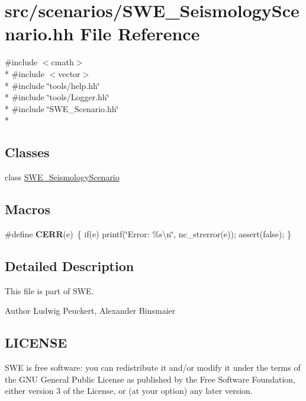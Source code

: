 \hypertarget{SWE__SeismologyScenario_8hh}{\section{src/scenarios/\-S\-W\-E\-\_\-\-Seismology\-Scenario.hh File Reference}
\label{SWE__SeismologyScenario_8hh}
}
{\ttfamily \#include $<$cmath$>$}\\*
{\ttfamily \#include $<$vector$>$}\\*
{\ttfamily \#include \char`\"{}tools/help.\-hh\char`\"{}}\\*
{\ttfamily \#include \char`\"{}tools/\-Logger.\-hh\char`\"{}}\\*
{\ttfamily \#include \char`\"{}S\-W\-E\-\_\-\-Scenario.\-hh\char`\"{}}\\*
\subsection*{Classes}
\begin{DoxyCompactItemize}
\item 
class \hyperlink{classSWE__SeismologyScenario}{S\-W\-E\-\_\-\-Seismology\-Scenario}
\end{DoxyCompactItemize}
\subsection*{Macros}
\begin{DoxyCompactItemize}
\item 
\hypertarget{SWE__SeismologyScenario_8hh_a05431804ae1ab8a7630a2b4572152855}{\#define {\bfseries C\-E\-R\-R}(e)~\{ if(e) printf(\char`\"{}Error\-: \%s\textbackslash{}n\char`\"{}, nc\-\_\-strerror(e)); assert(false); \}}\label{SWE__SeismologyScenario_8hh_a05431804ae1ab8a7630a2b4572152855}

\end{DoxyCompactItemize}


\subsection{Detailed Description}
This file is part of S\-W\-E.

\begin{DoxyAuthor}{Author}
Ludwig Peuckert, Alexander Binsmaier
\end{DoxyAuthor}
\hypertarget{Writer_8hh_LICENSE}{}\subsection{L\-I\-C\-E\-N\-S\-E}\label{Writer_8hh_LICENSE}
S\-W\-E is free software\-: you can redistribute it and/or modify it under the terms of the G\-N\-U General Public License as published by the Free Software Foundation, either version 3 of the License, or (at your option) any later version.

